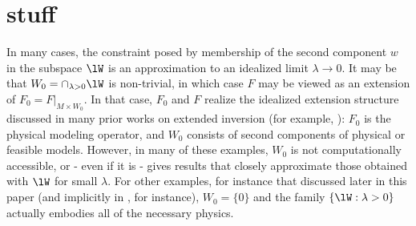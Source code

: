 \section{stuff}
In many cases, the constraint posed by membership of the second component $w$ in the subspace $\lW$ is an approximation to an idealized limit $\lambda \rightarrow 0$.
It may be that $W_0 = \cap_{\lambda > 0}\lW$ is non-trivial, in which
case $F$ may be viewed as an extension of $F_0 = F|_{ M \times
  W_0}$. In that case, $F_0$ and $F$ realize the idealized extension
structure discussed in many prior works on extended inversion (for
example, \cite[]{geoprosp:2008}): $F_0$ is the physical modeling
operator, and $W_0$ consists of second components of physical or
feasible models. However, in many of these examples, $W_0$ is not
computationally accessible, or - even if it is - gives results that
closely approximate those obtained with $\lW$ for small $\lambda$. For
other examples, for instance that  discussed later in this paper (and
implicitly in \cite[]{Warner:16}, for instance), $W_0=\{0\}$ and the
family $\{\lW: \lambda > 0\}$ actually embodies all of the necessary
physics.



